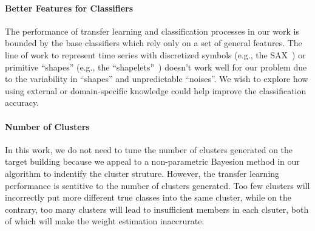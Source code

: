 \paragraph{Better Features for Classifiers} The performance of transfer learning and classification processes in our work is bounded by the base classifiers which rely only on a set of general features. The line of work to represent time series with discretized symbols (e.g., the SAX~\cite{sax}) or primitive ``shapes'' (e.g., the ``shapelets''~\cite{shapelet1, shapelet2}) doesn't work well for our problem due to the variability in ``shapes'' and unpredictable ``noises''. We wish to explore how using external or domain-specific knowledge could help improve the classification accuracy. 

\paragraph{Number of Clusters}
In this work, we do not need to tune the number of clusters generated on the target building because we appeal to a non-parametric Bayesion method in our algorithm to indentify the cluster struture. However, the transfer learning performance is sentitive to the number of clusters generated.
Too few clusters will incorrectly put more different true classes into the same cluster, while on the contrary, too many clusters will lead to insufficient members in each clsuter, both of which will make the weight estimation inaccrurate.
